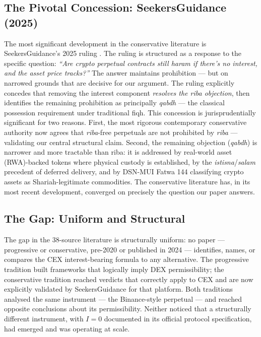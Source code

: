 \documentclass[10pt,twocolumn]{article}
\begin{document}
\subsection{The Pivotal Concession: SeekersGuidance (2025)}

The most significant development in the conservative literature is
SeekersGuidance's 2025 ruling \cite{SeekersGuidance2025}. The ruling is
structured as a response to the specific question: \emph{``Are crypto perpetual
contracts still haram if there's no interest, and the asset price tracks?''}
The answer maintains prohibition --- but on narrowed grounds that are decisive
for our argument.
The ruling explicitly concedes that removing the interest component
\emph{resolves the riba objection}, then identifies the remaining prohibition
as principally \textit{qabdh} --- the classical possession requirement under
traditional fiqh.
This concession is jurisprudentially significant for two reasons.
First, the most rigorous contemporary conservative authority now agrees that
\textit{riba}-free perpetuals are not prohibited by \textit{riba} --- validating
our central structural claim.
Second, the remaining objection (\textit{qabdh}) is narrower and more tractable
than riba: it is addressed by real-world asset (RWA)-backed tokens where physical
custody is established, by the \textit{istisna}/\textit{salam} precedent of
deferred delivery, and by DSN-MUI Fatwa 144 \cite{DSNMUI2021} classifying
crypto assets as Shariah-legitimate commodities.
The conservative literature has, in its most recent development, converged on
precisely the question our paper answers.

\subsection{The Gap: Uniform and Structural}

The gap in the 38-source literature is structurally uniform: no paper ---
progressive or conservative, pre-2020 or published in 2024 --- identifies,
names, or compares the CEX interest-bearing formula to any alternative.
The progressive tradition built frameworks that logically imply DEX permissibility;
the conservative tradition reached verdicts that correctly apply to CEX and are
now explicitly validated by SeekersGuidance for that platform.
Both traditions analysed the same instrument --- the Binance-style perpetual ---
and reached opposite conclusions about its permissibility.
Neither noticed that a structurally different instrument, with $I = 0$
documented in its official protocol specification, had emerged and was operating
at scale.
\end{document}
